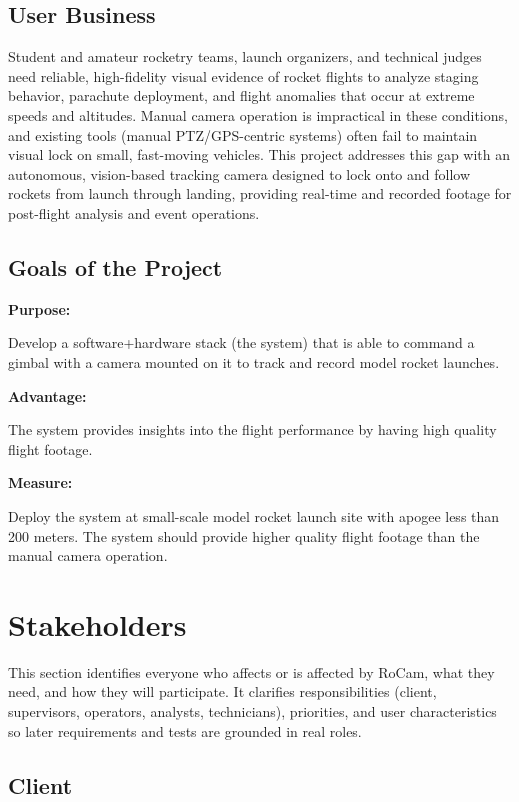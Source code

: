 \documentclass[12pt]{article}
\begin{document}
\subsection{User Business}

Student and amateur rocketry teams, launch organizers, and technical judges
need reliable, high-fidelity visual evidence of rocket flights to analyze
staging behavior, parachute deployment, and flight anomalies that occur at
extreme speeds and altitudes. Manual camera operation is impractical in these
conditions, and existing tools (manual PTZ/GPS-centric systems) often fail to
maintain visual lock on small, fast-moving vehicles. This project addresses
this gap with an autonomous, vision-based tracking camera designed to lock onto
and follow rockets from launch through landing, providing real-time and
recorded footage for post-flight analysis and event operations.

\subsection{Goals of the Project}

\textbf{Purpose:}

Develop a software+hardware stack (the system) that is able to command a gimbal
with a camera mounted on it to track and record model rocket launches.

\textbf{Advantage:}

The system provides insights into the flight performance by having high quality
flight footage.

\textbf{Measure:}

Deploy the system at small-scale model rocket launch site with apogee less than
200 meters. The system should provide higher quality flight footage than the
manual camera operation.

\section{Stakeholders}
This section identifies everyone who affects or is affected by RoCam, what they
need, and how they will participate. It clarifies responsibilities (client,
supervisors, operators, analysts, technicians), priorities, and user
characteristics so later requirements and tests are grounded in real roles.

\subsection{Client}
\end{document}
